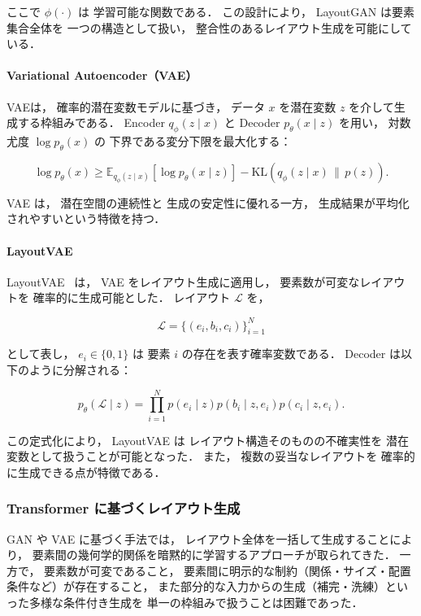 \documentclass[a4j,12pt,dvipdfmx]{jsreport}
\begin{document}
ここで $\phi(\cdot)$ は
学習可能な関数である．
この設計により，
LayoutGAN は要素集合全体を
一つの構造として扱い，
整合性のあるレイアウト生成を可能にしている．

\paragraph{Variational Autoencoder（VAE）}
VAEは，
確率的潜在変数モデルに基づき，
データ $x$ を潜在変数 $z$ を介して生成する枠組みである．
Encoder $q_\phi(z \mid x)$ と
Decoder $p_\theta(x \mid z)$ を用い，
対数尤度 $\log p_\theta(x)$ の
下界である変分下限を最大化する：

\begin{equation}
   \log p_\theta(x)
   \ge
   \mathbb{E}_{q_\phi(z \mid x)}[\log p_\theta(x \mid z)]
   -
   \mathrm{KL}(q_\phi(z \mid x)\,\|\,p(z)).
\end{equation}

VAE は，
潜在空間の連続性と
生成の安定性に優れる一方，
生成結果が平均化されやすいという特徴を持つ．

\paragraph{LayoutVAE}
LayoutVAE~\cite{jyothi_layoutvae_2021} は，
VAE をレイアウト生成に適用し，
要素数が可変なレイアウトを
確率的に生成可能とした．
レイアウト $\mathcal{L}$ を，

\begin{equation}
   \mathcal{L} = \{(e_i, b_i, c_i)\}_{i=1}^{N}
\end{equation}

として表し，
$e_i \in \{0,1\}$ は
要素 $i$ の存在を表す確率変数である．
Decoder は以下のように分解される：

\begin{equation}
   p_\theta(\mathcal{L} \mid z)
   =
   \prod_{i=1}^{N}
   p(e_i \mid z)
   p(b_i \mid z, e_i)
   p(c_i \mid z, e_i).
\end{equation}

この定式化により，
LayoutVAE は
レイアウト構造そのものの不確実性を
潜在変数として扱うことが可能となった．
また，
複数の妥当なレイアウトを
確率的に生成できる点が特徴である．

\subsubsection{Transformer に基づくレイアウト生成}
\label{sec:layoutformer}

GAN や VAE に基づく手法では，
レイアウト全体を一括して生成することにより，
要素間の幾何学的関係を暗黙的に学習するアプローチが取られてきた．
一方で，
要素数が可変であること，
要素間に明示的な制約（関係・サイズ・配置条件など）が存在すること，
また部分的な入力からの生成（補完・洗練）といった多様な条件付き生成を
単一の枠組みで扱うことは困難であった．
\end{document}
